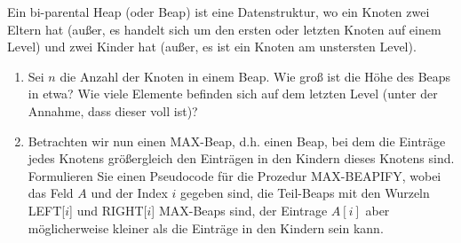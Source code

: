 
\begin{exercise}

Ein bi-parental Heap (oder Beap) ist eine Datenstruktur, wo ein Knoten zwei Eltern hat
(außer, es handelt sich um den ersten oder letzten Knoten auf einem Level) und zwei Kinder hat (außer, es ist ein Knoten am unstersten Level).

\begin{enumerate}[label = \alph*)]
  \item Sei $n$ die Anzahl der Knoten in einem Beap. Wie groß ist die Höhe des Beaps in etwa? Wie viele Elemente befinden sich auf dem letzten Level (unter der Annahme, dass dieser voll ist)?
  \item Betrachten wir nun einen MAX-Beap, d.h. einen Beap, bei dem die Einträge jedes Knotens größergleich den Einträgen in den Kindern dieses Knotens sind. Formulieren Sie einen Pseudocode für die Prozedur MAX-BEAPIFY, wobei das Feld $A$ und der Index $i$ gegeben sind, die Teil-Beaps mit den Wurzeln LEFT[$i$] und RIGHT[$i$] MAX-Beaps sind, der Eintrage $A[i]$ aber möglicherweise kleiner als die Einträge in den Kindern sein kann.
\end{enumerate}
\end{exercise}



